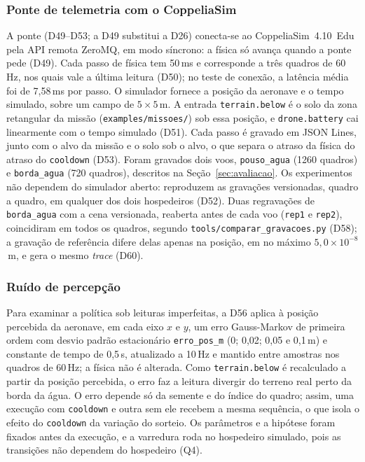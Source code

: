 \documentclass[conference]{IEEEtran}
\begin{document}
\subsubsection{Ponte de telemetria com o CoppeliaSim}
\label{sec:ponte}
A ponte (D49--D53; a D49 substitui a D26) conecta-se ao CoppeliaSim~4.10~Edu pela
API remota ZeroMQ, em modo síncrono: a física só avança quando a ponte pede
(D49). Cada passo de física tem 50\,ms e corresponde a três quadros de
60\,Hz, nos quais vale a última leitura (D50); no teste de conexão, a latência
média foi de 7,58\,ms por passo. O simulador fornece a posição da aeronave e o
tempo simulado, sobre um campo de $5 \times 5$\,m. A entrada
\texttt{terrain.below} é o solo da zona retangular da missão
(\texttt{examples/missoes/}) sob essa posição, e \texttt{drone.battery} cai
linearmente com o tempo simulado (D51). Cada passo é gravado em JSON Lines,
junto com o alvo da missão e o solo sob o alvo, o que separa o atraso da
física do atraso do \texttt{cooldown} (D53). Foram gravados dois voos,
\texttt{pouso\_agua} (1260 quadros) e \texttt{borda\_agua} (720 quadros),
descritos na Seção~\ref{sec:avaliacao}. Os experimentos não dependem do
simulador aberto: reproduzem as gravações versionadas, quadro a quadro, em
qualquer dos dois hospedeiros (D52). Duas regravações de \texttt{borda\_agua}
com a cena versionada, reaberta antes de cada voo (\texttt{rep1} e
\texttt{rep2}), coincidiram em todos os quadros, segundo
\texttt{tools/comparar\_gravacoes.py} (D58); a gravação de referência difere
delas apenas na posição, em no máximo $5{,}0 \times 10^{-8}$\,m, e gera o
mesmo \textit{trace} (D60).

\subsubsection{Ruído de percepção}
\label{sec:percepcao}
Para examinar a política sob leituras imperfeitas, a D56 aplica à posição
percebida da aeronave, em cada eixo $x$ e $y$, um erro Gauss-Markov de
primeira ordem com desvio padrão estacionário \texttt{erro\_pos\_m} (0; 0,02;
0,05 e 0,1\,m) e constante de tempo de 0,5\,s, atualizado a 10\,Hz e mantido
entre amostras nos quadros de 60\,Hz; a física não é alterada. Como
\texttt{terrain.below} é recalculado a partir da posição percebida, o erro faz
a leitura divergir do terreno real perto da borda da água. O erro depende só
da semente e do índice do quadro; assim, uma execução com \texttt{cooldown} e
outra sem ele recebem a mesma sequência, o que isola o efeito do
\texttt{cooldown} da variação do sorteio. Os parâmetros e a hipótese foram
fixados antes da execução, e a varredura roda no hospedeiro simulado, pois as
transições não dependem do hospedeiro (Q4).
\end{document}
